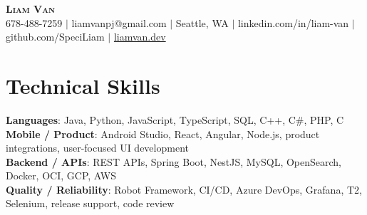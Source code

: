 \documentclass[letterpaper,11pt]{article}
\begin{document}

%
\begin{center}
    \textbf{\Huge \scshape Liam Van} \\ \vspace{1pt}
    \small 678-488-7259 $|$ \small {liamvanpj@gmail.com} $|$ Seattle, WA
 {{$|$ linkedin.com/in/liam-van} {$|$ github.com/SpeciLiam} {$|$ \href{https://liamvan.dev}{liamvan.dev}}}

\end{center}

\section{Technical Skills}
 \begin{itemize}[leftmargin=0.15in, label={}]
    \small{\item{
     \textbf{Languages}{: Java, Python, JavaScript, TypeScript, SQL, C++, C\#, PHP, C} \\
     \textbf{Mobile / Product}{: Android Studio, React, Angular, Node.js, product integrations, user-focused UI development} \\
     \textbf{Backend / APIs}{: REST APIs, Spring Boot, NestJS, MySQL, OpenSearch, Docker, OCI, GCP, AWS} \\
     \textbf{Quality / Reliability}{: Robot Framework, CI/CD, Azure DevOps, Grafana, T2, Selenium, release support, code review} \\
    }}
 \end{itemize}
%

\end{document}
